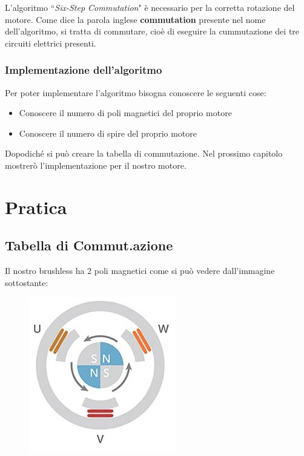 \documentclass[a4paper]{report}
\begin{document}
        L'algoritmo {``}\textit{Six-Step Commutation}{"} è necessario per la corretta rotazione del motore.
        Come dice la parola inglese \textbf{commutation} presente nel nome dell'algoritmo, si tratta di commutare, cioè di eseguire la cummutazione dei tre circuiti elettrici presenti.

    \subsection{Implementazione dell'algoritmo}
        Per poter implementare l'algoritmo bisogna conoscere le seguenti cose:
        \begin{itemize}
            \item Conoscere il numero di poli magnetici del proprio motore
            \item Conoscere il numero di spire del proprio motore
        \end{itemize}
        Dopodiché si può creare la tabella di commutazione.
        Nel prossimo capitolo mostrerò l'implementazione per il nostro motore.

\chapter{Pratica}
\section{Tabella di Commut.azione}
    Il nostro brushless ha 2 poli magnetici come si può vedere dall'immagine sottostante:
    \begin{figure}[h]
        \centering
        \includegraphics[scale=0.7, keepaspectratio=true]{poli}
    \end{figure}
\end{document}
